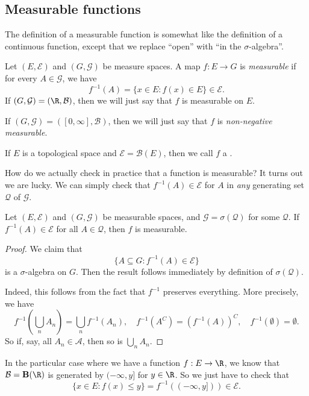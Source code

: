\documentclass[a4paper]{article}
\begin{document}
\subsection{Measurable functions}
The definition of a measurable function is somewhat like the definition of a continuous function, except that we replace ``open'' with ``in the $\sigma$-algebra''.

\begin{defi}
  Let $(E, \mathcal{E})$ and $(G, \mathcal{G})$ be measure spaces. A map $f: E \to G$ is \emph{measurable} if for every $A \in \mathcal{G}$, we have
  \[
    f^{-1}(A) = \{x \in E: f(x) \in E\} \in \mathcal{E}.
  \]
  If $(G, \mathcal{G}) = (\R, \mathcal{B})$, then we will just say that $f$ is measurable on $E$.

  If $(G, \mathcal{G}) = ([0, \infty], \mathcal{B})$, then we will just say that $f$ is \emph{non-negative measurable}.

  If $E$ is a topological space and $\mathcal{E} = \mathcal{B}(E)$, then we call $f$ a .
\end{defi}

How do we actually check in practice that a function is measurable? It turns out we are lucky. We can simply check that $f^{-1}(A) \in \mathcal{E}$ for $A$ in \emph{any} generating set $\mathcal{Q}$ of $\mathcal{G}$.
\begin{lemma}
  Let $(E, \mathcal{E})$ and $(G, \mathcal{G})$ be measurable spaces, and $\mathcal{G} = \sigma(\mathcal{Q})$ for some $\mathcal{Q}$. If $f^{-1}(A) \in \mathcal{E}$ for all $A \in \mathcal{Q}$, then $f$ is measurable.
\end{lemma}

\begin{proof}
  We claim that
  \[
    \{A \subseteq G: f^{-1}(A) \in \mathcal{E}\}
  \]
  is a $\sigma$-algebra on $G$. Then the result follows immediately by definition of $\sigma(\mathcal{Q})$.

  Indeed, this follows from the fact that $f^{-1}$ preserves everything. More precisely, we have
  \[
    f^{-1}\left(\bigcup_n A_n\right) = \bigcup_n f^{-1}(A_n),\quad f^{-1}(A^C) = (f^{-1}(A))^C,\quad f^{-1}(\emptyset) = \emptyset.
  \]
  So if, say, all $A_n \in \mathcal{A}$, then so is $\bigcup_n A_n$.
\end{proof}

\begin{eg}
  In the particular case where we have a function $f: E \to \R$, we know that $\mathcal{B} = \mathbf{B}(\R)$ is generated by $(-\infty, y]$ for $y \in \R$. So we just have to check that
  \[
    \{x \in E: f(x) \leq y\} = f^{-1}((-\infty, y])) \in \mathcal{E}.
  \]
\end{eg}
\end{document}
